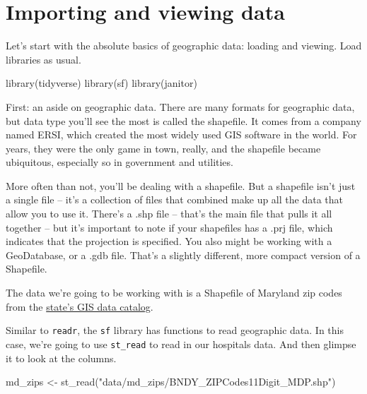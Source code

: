 \documentclass[
  letterpaper,
  DIV=11,
  numbers=noendperiod]{scrreprt}
\newenvironment{Shaded}{\begin{snugshade}}{\end{snugshade}}
\newcommand{\FunctionTok}[1]{\textcolor[rgb]{0.28,0.35,0.67}{#1}}
\newcommand{\NormalTok}[1]{\textcolor[rgb]{0.00,0.23,0.31}{#1}}
\newcommand{\OtherTok}[1]{\textcolor[rgb]{0.00,0.23,0.31}{#1}}
\newcommand{\StringTok}[1]{\textcolor[rgb]{0.13,0.47,0.30}{#1}}
\begin{document}
\hypertarget{importing-and-viewing-data}{%
\section{Importing and viewing data}\label{importing-and-viewing-data}}

Let's start with the absolute basics of geographic data: loading and
viewing. Load libraries as usual.

\begin{Shaded}
\begin{Highlighting}[]
\FunctionTok{library}\NormalTok{(tidyverse)}
\FunctionTok{library}\NormalTok{(sf)}
\FunctionTok{library}\NormalTok{(janitor)}
\end{Highlighting}
\end{Shaded}

First: an aside on geographic data. There are many formats for
geographic data, but data type you'll see the most is called the
shapefile. It comes from a company named ERSI, which created the most
widely used GIS software in the world. For years, they were the only
game in town, really, and the shapefile became ubiquitous, especially so
in government and utilities.

More often than not, you'll be dealing with a shapefile. But a shapefile
isn't just a single file -- it's a collection of files that combined
make up all the data that allow you to use it. There's a .shp file --
that's the main file that pulls it all together -- but it's important to
note if your shapefiles has a .prj file, which indicates that the
projection is specified. You also might be working with a GeoDatabase,
or a .gdb file. That's a slightly different, more compact version of a
Shapefile.

The data we're going to be working with is a Shapefile of Maryland zip
codes from the
\href{https://data.imap.maryland.gov/datasets/38f3f8bc61bb4261b59d71b3642e3cd6_3/explore?location=38.810313\%2C-77.268250\%2C8.83}{state's
GIS data catalog}.

Similar to \texttt{readr}, the \texttt{sf} library has functions to read
geographic data. In this case, we're going to use \texttt{st\_read} to
read in our hospitals data. And then glimpse it to look at the columns.

\begin{Shaded}
\begin{Highlighting}[]
\NormalTok{md\_zips }\OtherTok{\textless{}{-}} \FunctionTok{st\_read}\NormalTok{(}\StringTok{"data/md\_zips/BNDY\_ZIPCodes11Digit\_MDP.shp"}\NormalTok{)}
\end{Highlighting}
\end{Shaded}
\end{document}
